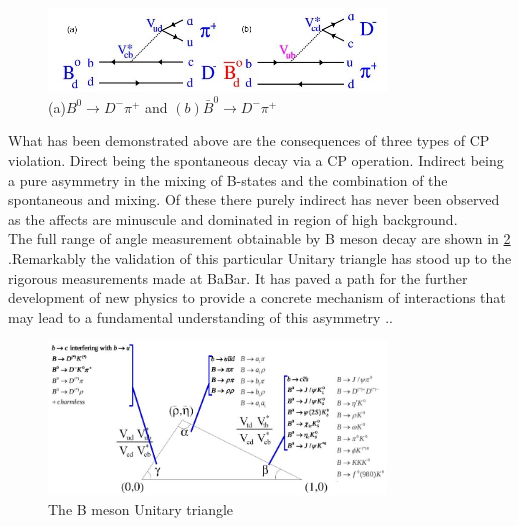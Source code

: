  \begin{figure}[h]
\centering
\includegraphics[width=0.8\textwidth]{figs/gam.JPG}
\caption{(a)$ B^{0} \rightarrow D^{-}\pi^{+}$ and $(b) \bar{B}^{0} \rightarrow D^{-}\pi^{+}$}
\label{pBGD}
\end{figure}


What has been demonstrated above are the consequences of three types of CP violation. Direct being the spontaneous decay via a CP operation. Indirect being a pure asymmetry in the mixing of B-states and the combination of the spontaneous and mixing. Of these there purely indirect has never been observed as the affects are minuscule and dominated in region of high background.
\\

The full range of angle measurement obtainable by B meson decay are shown in \cref{BBD9} .Remarkably the validation of this particular Unitary triangle has stood up to the rigorous measurements made at BaBar. It has paved a path for the further development of new physics to provide a concrete mechanism of interactions that may lead to a fundamental understanding of this asymmetry .\cite{B18}.
 \begin{figure}[h]
\centering
\includegraphics[width=0.8\textwidth]{figs/trig.JPG}
\caption{The B meson Unitary triangle}
\label{BBD9}
\end{figure}



%
